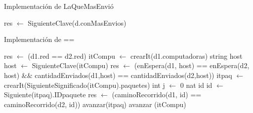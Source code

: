 \begin{Algoritmos}
\begin{algorithm}
\caption{Implementaci\'on de LaQueMasEnvi\'o}
\begin{algorithmic}[0]
	\State res $\gets$ SiguienteClave(d.conMasEnvios)	 
\EndFunction {}
\end{algorithmic}
\end{algorithm}



\begin{algorithm}
\caption{Implementaci\'on de ==}
\begin{algorithmic}[0]
	\State res $\gets$ (d1.red == d2.red)						
	 													
		\State itCompu $\gets$ crearIt(d1.computadoras)  		
		\State string host 										
			
			\State host $\gets$ SiguienteClave(itCompu)			 
			\State res $\gets$ (enEspera(d1, host) == enEspera(d2, host) $\&\&$ \newline  cantidadEnviados(d1,host) == cantidadEnviados(d2,host))  
			\State itpaq $\gets$ crearIt(SiguienteSignificado(itCompu).paquetes) 
			\State int j $\gets$ 0												
			\State nat id														
				
				\State id $\gets$ Siguiente(itpaq).IDpaquete 					
				\State res $\gets$ (caminoRecorrido(d1, id) == caminoRecorrido(d2, id)) 
				\State avanzar(itpaq)											
			\EndWhile
		\State avanzar (itCompu)													
		\EndWhile
	\EndIf
\EndFunction {}
\end{algorithmic}
\end{algorithm}

\end{Algoritmos}

\clearpage


